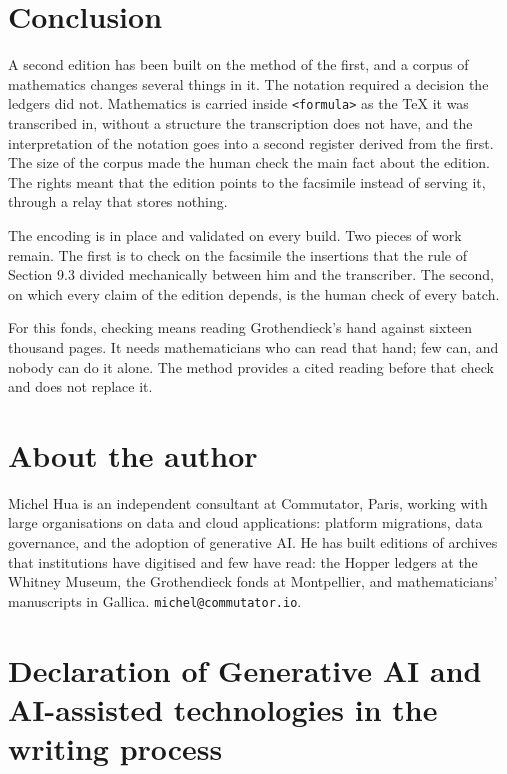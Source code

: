 \documentclass[11pt]{article}
\begin{document}
\section{Conclusion}

A second edition has been built on the method of the first, and a corpus of mathematics changes several things in it. The notation required a decision the ledgers did not. Mathematics is carried inside \texttt{<formula>} as the TeX it was transcribed in, without a structure the transcription does not have, and the interpretation of the notation goes into a second register derived from the first. The size of the corpus made the human check the main fact about the edition. The rights meant that the edition points to the facsimile instead of serving it, through a relay that stores nothing.

The encoding is in place and validated on every build. Two pieces of work remain. The first is to check on the facsimile the insertions that the rule of Section 9.3 divided mechanically between him and the transcriber. The second, on which every claim of the edition depends, is the human check of every batch.

For this fonds, checking means reading Grothendieck's hand against sixteen thousand pages. It needs mathematicians who can read that hand; few can, and nobody can do it alone. The method provides a cited reading before that check and does not replace it.

\section*{About the author}

Michel Hua is an independent consultant at Commutator, Paris, working with large organisations on data and cloud applications: platform migrations, data governance, and the adoption of generative AI. He has built editions of archives that institutions have digitised and few have read: the Hopper ledgers at the Whitney Museum, the Grothendieck fonds at Montpellier, and mathematicians' manuscripts in Gallica. \texttt{michel@commutator.io}.

\section*{Declaration of Generative AI and AI-assisted technologies in the writing process}
\end{document}
